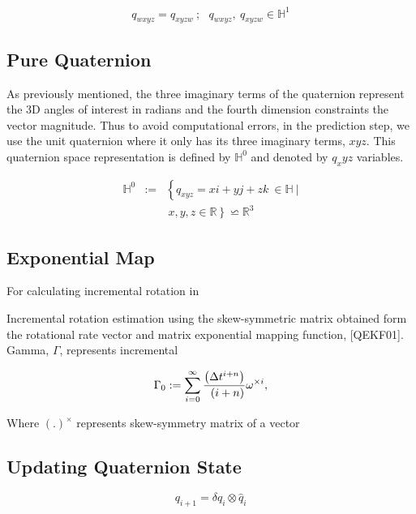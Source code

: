 \documentclass[letterpaper, 10 pt, conference]{ieeeconf}  %
\begin{document}
\begin{equation}
\label{eq:12}
q_{wxyz} = q_{xyzw} ~; ~~~ q_{wxyz},~q_{xyzw} \in \mathbb{H}^{1}
\end{equation}


\subsection{Pure Quaternion}
As previously mentioned, the three imaginary terms of the quaternion represent the
3D angles of interest in radians and the fourth dimension constraints the vector
magnitude. Thus to avoid computational errors, in the prediction step, we use
the unit quaternion where it only has its three imaginary terms, $xyz$.
This quaternion space representation is defined by $\mathbb{H}^{0}$ and
denoted by $q_xyz$ variables.



\begin{eqnarray}\nonumber
\label{eq:11}
\mathbb{H}^{0} &:=& \left\{ q_{xyz}=xi+yj+zk~ \in \mathbb{H}~| \right.\\
&& \left. ~x,y,z \in \mathbb{R} \right\} \backsimeq  \mathbb{R}^3
\end{eqnarray}



\subsection{Exponential Map}

For calculating incremental rotation in

Incremental rotation estimation using the skew-symmetric matrix obtained form
the rotational rate vector and matrix exponential mapping function, [QEKF01].
Gamma, $\Gamma$, represents incremental

\begin{equation}
\label{eq:2}
\Gamma_{0} := \sum_{i=0}^{\infty} \frac{ \left( \Delta t^{i+n}  \right)}{ \\
\left( i + n \right) \! } \\
\omega^{\times i},
\end{equation}

Where $(.)^{\times}$ represents skew-symmetry matrix of a vector


\subsection{Updating Quaternion State}
\begin{equation}
\label{eq:13}
q_{i+1} = \delta q_{i} \otimes \widehat{q}_{i}
\end{equation}
\end{document}
